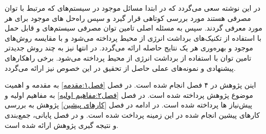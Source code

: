 در این نوشته سعی می‌گردد که در ابتدا مسائل موجود در سیستم‌های  که مرتبط با توان مصرفی هستند مورد بررسی کوتاهی قرار گیرد و سپس راه‌حل های موجود برای هر مورد معرفی گردند. سپس به مسئله اصلی تامین توان مصرفی سیستم‌های  و قابل حمل با استفاده از تکنیک‌های برداشت انرژی از محیط پرداخته می‌شود و با مقایسه روش‌های موجود و بهره‌وری هر یک نتایج حاصله ارائه می‌گردد. در انتها نیز به چند روش جدیدتر تامین توان با استفاده از برداشت انرژی از محیط پرداخته می‌شود. برخی راهکارهای پیشنهادی و نمونه‌های عملی حاصل از تحقیق در این خصوص نیز ارائه می‌گردد.


	
اینن پژوهش در ۴ فصل انجام شده است. در فصل \ref{فصل۱:مقدمه} به مقدمه و اهمیت موضوع پژوهش پرداخته شده است. در فصل \ref{فصل۲:مفاهیم اولیه} به مفاهیم اولیه و پیش‌نیاز ها پرداخته شده است. در ادامه در فصل \ref{کار‌های پیشین} پژوهش به بررسی کار‌های پیشین انجام شده در این زمینه پرداخت شده است. و در فصل پایانی، جمع‌بندی و نتیجه گیری پژوهش ارائه شده است.